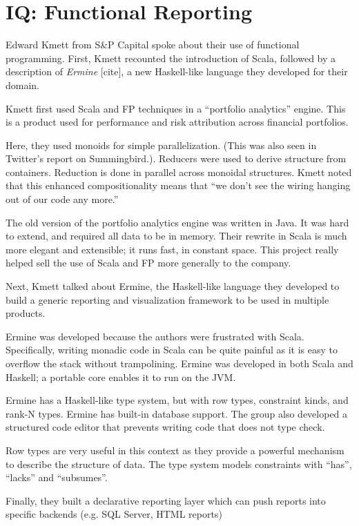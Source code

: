 \documentclass{jfp1}
\newcommand\needcite{{\color{red} [cite]}\xspace}
\begin{document}
\section{IQ: Functional Reporting}


Edward Kmett from S\&P Capital spoke about their use of functional
programming. First, Kmett recounted the introduction of Scala, followed by a
description of \textit{Ermine}\needcite, a new Haskell-like  language they
developed for their domain.

Kmett first used Scala and FP techniques in a ``portfolio analytics''
engine. This is a product used for performance and risk attribution
across financial portfolios.

Here, they used monoids for simple parallelization. (This was also
seen in Twitter's report on Summingbird.). Reducers were used to
derive structure from containers.  Reduction
is done in parallel across monoidal structures. Kmett noted that this
enhanced compositionality means that ``we don't see the wiring hanging
out of our code any more.''

The old version of the portfolio analytics engine was written in Java.
It was hard to extend, and required all data to be in memory. Their
rewrite in Scala is much more elegant and extensible; it runs fast, in
constant space. This project really helped sell the use of Scala and
FP more generally to the company.

Next, Kmett talked about Ermine, the Haskell-like language they
developed to build a generic reporting and visualization framework to
be used in multiple products.

Ermine was developed because the authors were frustrated with Scala.
Specifically, writing monadic code in Scala can be quite painful as it
is easy to overflow the stack without trampolining. Ermine was developed
in both Scala and Haskell; a portable core enables it to run on the
JVM.

Ermine has a Haskell-like type system, but with row types, constraint
kinds, and rank-N types. Ermine has built-in database support. The
group also developed a structured code editor that prevents writing
code that does not type check.

Row types are very useful in this context as they provide a powerful mechanism
to describe the structure of data. The type system models constraints
with ``has'', ``lacks'' and ``subsumes''.

Finally, they built a declarative reporting layer which can push reports
into specific backends (e.g. SQL Server, HTML reports)
\end{document}
